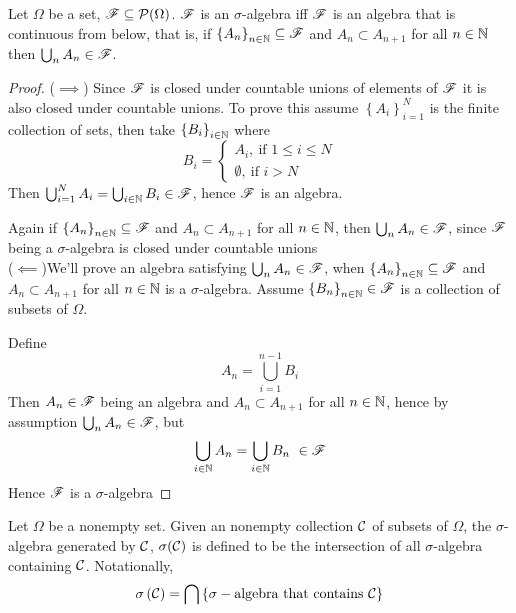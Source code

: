 \begin{proposition}
    Let $\Omega$ be a set, ${\mathscr F} \subseteq {\cal P} (\Omega )$. ${\mathscr F}$ is an $\sigma$-algebra iff ${\mathscr F}$ is an algebra that is continuous from below, that is, if $\left\{ A_n \right\}_{n\in \mathbb N} \subseteq {\mathscr F}$ and $A_n \subset A_{n+1}$ for all $n\in \mathbb N$ then $\bigcup _n A_n \in {\mathscr F}$.
\end{proposition}

\begin{proof}
    ($\implies$) Since ${\mathscr F}$ is closed under countable unions of elements of ${\mathscr F}$ it is also closed under countable unions. To prove this assume $\left\{ A_i \right\}_{i=1}^{N}$ is the finite collection of sets, then take $\left\{ B_i \right\}_{i \in \mathbb N}$ where
    \begin{equation*}
        B_i = 
        \begin{cases}
            A_i, \ \text{if } 1 \le i \le N \\
            \emptyset, \ \text{if } i > N
        \end{cases}
    \end{equation*}
    Then $\bigcup_{i=1}^N A_i = \bigcup_{i \in \mathbb N} B_i \in {\mathscr F}$, hence ${\mathscr F}$ is an algebra. 

    Again if $\left\{ A_n \right\}_{n\in \mathbb N} \subseteq {\mathscr F}$ and $A_n \subset A_{n+1}$ for all $n\in \mathbb N$, then $\bigcup _n A_n \in {\mathscr F}$, since ${\mathscr F}$ being a $\sigma$-algebra is closed under countable unions \\


    ($\impliedby$)We'll prove an algebra satisfying $\bigcup _n A_n \in {\mathscr F}$, when $\left\{ A_n \right\}_{n\in \mathbb N} \subseteq {\mathscr F}$ and $A_n \subset A_{n+1}$ for all $n\in \mathbb N$ is a $\sigma$-algebra.
    Assume $\left\{ B_n \right\}_{n\in \mathbb N} \in {\mathscr F}$ is a collection of subsets of $\Omega$.

    Define
       $$ A_n = \bigcup_{i = 1}^{n-1}B_i $$
    Then $A_n \in {\mathscr F}$ being an algebra and $A_n \subset A_{n+1}$ for all $n \in \mathbb N$, hence by assumption $\bigcup_n A_n \in {\mathscr F}$, but
       $$
           \bigcup_{i \in \mathbb N} A_n  =  \bigcup_{i \in \mathbb N} B_n \ \in {\mathscr F}
       $$
    Hence ${\mathscr F}$ is a $\sigma$-algebra
\end{proof}

\begin{definition}
    Let $\Omega$ be a nonempty set. Given an nonempty collection ${\cal C}$ of subsets of $\Omega$, the $\sigma$-algebra generated by ${\cal C}$, $\sigma ({\cal C})$ is defined to be the intersection of all $\sigma$-algebra containing ${\cal C}$. Notationally,
    $$\sigma \left( {\cal C} \right) = \bigcap \left\{ \sigma-\text{algebra that contains  }{\cal C} \right\}$$
    \label{def:generated-sigma-algebra}
\end{definition}

